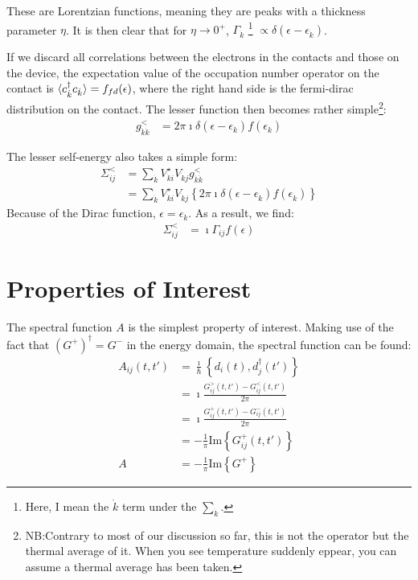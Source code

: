 These are Lorentzian functions, meaning they are peaks with a thickness parameter $\eta$. It is then clear that for $\eta\rightarrow 0^+$, $\Gamma_{\dot{k}}$ \footnote{Here, I mean the $\dot{k}$ term under the $\sum_{\dot{k}}$.} $\propto \delta(\epsilon-\epsilon_{\dot{k}})$. 

If we discard all correlations between the electrons in the contacts and those on the device, the expectation value of the occupation number operator on the contact is $\braket{c_{\dot{k}}^\dagger c_{\dot{k}}}=f_{fd}(\epsilon)$, where the right hand side is the fermi-dirac distribution on the contact. The lesser function then becomes rather simple\footnote{NB:Contrary to most of our discussion so far, this is not the operator but the thermal average of it. When you see temperature suddenly eppear, you can assume a thermal average has been taken.}:
\begin{align*}
g^<_{\dot{k}\dot{k}} &= 2\pi\imath \delta(\epsilon-\epsilon_{\dot{k}}) f(\epsilon_{\dot{k}})
\end{align*}

The lesser self-energy also takes a simple form:
\begin{align*}
\Sigma^<_{ij} &= \sum_{\dot{k}} V_{\dot{k}i}^\star V_{\dot{k}j} g_{\dot{k}\dot{k}}^< \\&= \sum_{\dot{k}} V_{\dot{k}i}^\star V_{\dot{k}j} \left\{2\pi\imath \delta(\epsilon-\epsilon_{\dot{k}}) f(\epsilon_{\dot{k}})\right\}
\end{align*}
Because of the Dirac function, $\epsilon=\epsilon_{\dot{k}}$. As a result, we find:
\begin{align*}
\Sigma^<_{ij} &= \imath \Gamma_{ij} f(\epsilon)
\end{align*}
\section{Properties of Interest}
\label{sec:properties}
The spectral function $A$ is the simplest property of interest. Making use of the fact that $\left(G^+\right)^\dagger = G^-$ in the energy domain, the spectral function can be found:
\begin{align*}
A_{ij}(t, t') &= \frac{\imath}{\hbar} \left\{ d_i(t), d_j^\dagger(t')\right\} \\
&= \imath \frac{ G^>_{ij}(t, t') - G^<_{ij}(t, t')}{2\pi} \\
&= \imath \frac{G^+_{ij}(t, t') - G^-_{ij}(t, t')}{2\pi}\\
&= - \frac{1}{\pi} \text{Im}\left\{ G^+_{ij}(t, t')\right\} \\
A &=- \frac{1}{\pi} \text{Im}\left\{ G^+\right\}
\end{align*}

